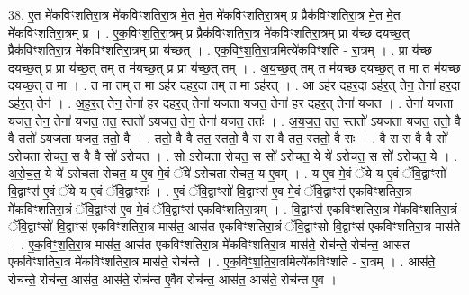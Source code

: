 \documentclass[17pt]{extarticle}
\begin{document}
38. ए॒त मे॑कविꣳशतिरा॒त्र मे॑कविꣳशतिरा॒त्र मे॒त मे॒त मे॑कविꣳशतिरा॒त्रम् प्र प्रैक॑विꣳशतिरा॒त्र मे॒त मे॒त मे॑कविꣳशतिरा॒त्रम् प्र । . ए॒क॒विꣳ॒॒श॒ति॒रा॒त्रम् प्र प्रैक॑विꣳशतिरा॒त्र मे॑कविꣳशतिरा॒त्रम् प्रा य॑च्छ दयच्छ॒त् प्रैक॑विꣳशतिरा॒त्र मे॑कविꣳशतिरा॒त्रम् प्रा य॑च्छत् । . ए॒क॒विꣳ॒॒श॒ति॒रा॒त्रमित्ये॑कविꣳशति - रा॒त्रम् । . प्रा य॑च्छ दयच्छ॒त् प्र प्रा य॑च्छ॒त् तम् त म॑यच्छ॒त् प्र प्रा य॑च्छ॒त् तम् । . अ॒य॒च्छ॒त् तम् त म॑यच्छ दयच्छ॒त् त मा त म॑यच्छ दयच्छ॒त् त मा । . त मा तम् त मा ऽह॑र दहर॒दा तम् त मा ऽह॑रत् । . आ ऽह॑र दहर॒दा ऽह॑र॒त् तेन॒ तेना॑ हर॒दा ऽह॑र॒त् तेन॑ । . अ॒ह॒र॒त् तेन॒ तेना॑ हर दहर॒त् तेना॑ यजता यजत॒ तेना॑ हर दहर॒त् तेना॑ यजत । . तेना॑ यजता यजत॒ तेन॒ तेना॑ यजत॒ तत॒ स्ततो॑ ऽयजत॒ तेन॒ तेना॑ यजत॒ ततः॑ । . अ॒य॒ज॒त॒ तत॒ स्ततो॑ ऽयजता यजत॒ ततो॒ वै वै ततो॑ ऽयजता यजत॒ ततो॒ वै । . ततो॒ वै वै तत॒ स्ततो॒ वै स स वै तत॒ स्ततो॒ वै सः । . वै स स वै वै सो॑ ऽरोचता रोचत॒ स वै वै सो॑ ऽरोचत । . सो॑ ऽरोचता रोचत॒ स सो॑ ऽरोचत॒ ये ये॑ ऽरोचत॒ स सो॑ ऽरोचत॒ ये । . अ॒रो॒च॒त॒ ये ये॑ ऽरोचता रोचत॒ य ए॒व मे॒वं ॅये॑ ऽरोचता रोचत॒ य ए॒वम् । . य ए॒व मे॒वं ॅये य ए॒वं ॅवि॒द्वाꣳसो॑ वि॒द्वाꣳस॑ ए॒वं ॅये य ए॒वं ॅवि॒द्वाꣳसः॑ । . ए॒वं ॅवि॒द्वाꣳसो॑ वि॒द्वाꣳस॑ ए॒व मे॒वं ॅवि॒द्वाꣳस॑ एकविꣳशतिरा॒त्र मे॑कविꣳशतिरा॒त्रं ॅवि॒द्वाꣳस॑ ए॒व मे॒वं ॅवि॒द्वाꣳस॑ एकविꣳशतिरा॒त्रम् । . वि॒द्वाꣳस॑ एकविꣳशतिरा॒त्र मे॑कविꣳशतिरा॒त्रं ॅवि॒द्वाꣳसो॑ वि॒द्वाꣳस॑ एकविꣳशतिरा॒त्र मास॑त॒ आस॑त एकविꣳशतिरा॒त्रं ॅवि॒द्वाꣳसो॑ वि॒द्वाꣳस॑ एकविꣳशतिरा॒त्र मास॑ते । . ए॒क॒विꣳ॒॒श॒ति॒रा॒त्र मास॑त॒ आस॑त एकविꣳशतिरा॒त्र मे॑कविꣳशतिरा॒त्र मास॑ते॒ रोच॑न्ते॒ रोच॑न्त॒ आस॑त एकविꣳशतिरा॒त्र मे॑कविꣳशतिरा॒त्र मास॑ते॒ रोच॑न्ते । . ए॒क॒विꣳ॒॒श॒ति॒रा॒त्रमित्ये॑कविꣳशति - रा॒त्रम् । . आस॑ते॒ रोच॑न्ते॒ रोच॑न्त॒ आस॑त॒ आस॑ते॒ रोच॑न्त ए॒वैव रोच॑न्त॒ आस॑त॒ आस॑ते॒ रोच॑न्त ए॒व । \newline
\end{document}
